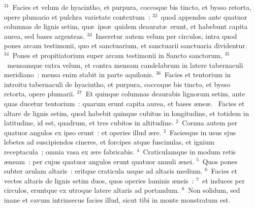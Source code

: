 ${}^{31}$~Facies et velum de hyacintho, et purpura, coccoque bis tincto, et bysso retorta, opere plumario et pulchra varietate contextum~:
${}^{32}$~quod appendes ante quatuor columnas de lignis setim, qu\ae\ ips\ae\ quidem deaurat\ae\ erunt, et habebunt capita aurea, sed bases argenteas.
${}^{33}$~Inseretur autem velum per circulos, intra quod pones arcam testimonii, quo et sanctuarium, et sanctuarii sanctuaria dividentur.
${}^{34}$~Pones et propitiatorium super arcam testimonii in Sancto sanctorum,
${}^{35}$~mensamque extra velum, et contra mensam candelabrum in latere tabernaculi meridiano~: mensa enim stabit in parte aquilonis.
${}^{36}$~Facies et tentorium in introitu tabernaculi de hyacintho, et purpura, coccoque bis tincto, et bysso retorta, opere plumarii.
${}^{37}$~Et quinque columnas deaurabis lignorum setim, ante quas ducetur tentorium~: quarum erunt capita aurea, et bases \ae ne\ae .
~\lettrine[lines=10,image=true,loversize=0.05,lraise=-0.03]{F}{}acies et altare de lignis setim, quod habebit quinque cubitus in longitudine, et totidem in latitudine, id est, quadrum, et tres cubitos in altitudine.
${}^{2}$~Cornua autem per quatuor angulos ex ipso erunt~: et operies illud \ae re.
${}^{3}$~Faciesque in usus ejus lebetes ad suscipiendos cineres, et forcipes atque fuscinulas, et ignium receptacula~; omnia vasa ex \ae re fabricabis.
${}^{4}$~Craticulamque in modum retis \ae neam~: per cujus quatuor angulos erunt quatuor annuli \ae nei.
${}^{5}$~Quos pones subter arulam altaris~: eritque craticula usque ad altaris medium.
${}^{6}$~Facies et vectes altaris de lignis setim duos, quos operies laminis \ae neis~:
${}^{7}$~et induces per circulos, eruntque ex utroque latere altaris ad portandum.
${}^{8}$~Non solidum, sed inane et cavum intrinsecus facies illud, sicut tibi in monte monstratum est.


